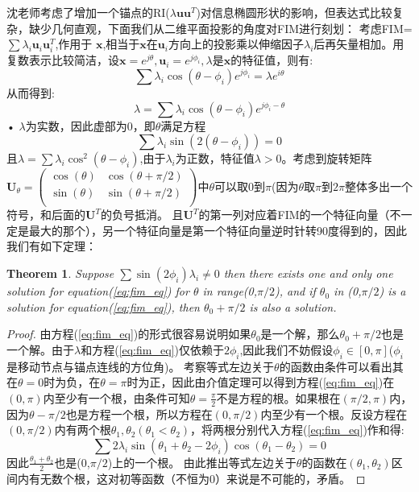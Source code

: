 \documentclass[12pt]{article}
\newtheorem{thm}{Theorem}[section]
\theoremstyle{remark}
\begin{document}
沈老师考虑了增加一个锚点的RI($\lambda \bm{u}\bm{u}^T$)对信息椭圆形状的影响，但表达式比较复杂，缺少几何直观，下面我们从二维平面投影的角度对FIM进行刻划：
考虑FIM=$\sum \lambda_i \bm{u}_i \bm{u}_i^T$,作用于
$\bm{x}$,相当于$\bm{x}$在$\bm{u}_i$方向上的投影乘以伸缩因子$\lambda_i$后再矢量相加。用复数表示比较简洁，设$\bm{x}=e^{j\theta},\bm{u}_i=e^{j\phi_i},\lambda$是$\bm{x}$的特征值，则有:
\begin{equation}
\sum \lambda_i \cos(\theta-\phi_i)e^{j\phi_i}=\lambda e^{i\theta}
\end{equation}
从而得到:
\begin{equation}
\lambda=\sum \lambda_i \cos(\theta-\phi_i)e^{j\phi_i-\theta}
\end{equation}•
$\lambda$为实数，因此虚部为0，即$\theta$满足方程
\begin{equation}\label{eq:fim_eq}
\sum \lambda_i \sin(2(\theta-\phi_i))=0
\end{equation}
且$\lambda=\sum \lambda_i \cos^2(\theta-\phi_i)$,由于$\lambda_i$为正数，特征值$\lambda>0$。考虑到旋转矩阵$\bm{U}_{\theta}=\left(\begin{array}{cc}
\cos(\theta) & \cos(\theta+\pi/2) \\
\sin(\theta) & \sin(\theta+\pi/2) \\
\end{array}\right)$中$\theta$可以取0到$\pi$(因为$\theta$取$\pi$到$2\pi$整体多出一个符号，和后面的$\bm{U}^T$的负号抵消。
且$\bm{U}^T$的第一列对应着FIM的一个特征向量（不一定是最大的那个），另一个特征向量是第一个特征向量逆时针转90度得到的，因此我们有如下定理：
\begin{thm} Suppose $\sum \sin(2\phi_i)\lambda_i \neq 0$
then
there exists one and only one solution for equation(\ref{eq:fim_eq}) for $\theta$ in range(0,$\pi/2$),
and if $\theta_0$ in (0,$\pi/2$) is a solution for equation(\ref{eq:fim_eq}), then $\theta_0+\pi/2$ is also a solution.\end{thm}
\begin{proof}
由方程(\ref{eq:fim_eq})的形式很容易说明如果$\theta_0$是一个解，那么$\theta_0+\pi/2$也是一个解。由于$\lambda$和方程(\ref{eq:fim_eq})仅依赖于$2\phi_i$,因此我们不妨假设$\phi_i \in [0,\pi]$($\phi_i$是移动节点与锚点连线的方位角)。
考察等式左边关于$\theta$的函数由条件可以看出其在$\theta=0$时为负，在$\theta=\pi$时为正，因此由介值定理可以得到方程(\ref{eq:fim_eq})在$(0,\pi)$内至少有一个根，由条件可知$\theta=\frac{\pi}{2}$不是方程的根。如果根在$(\pi/2,\pi)$内，因为$\theta-\pi/2$也是方程一个根，所以方程在$(0,\pi/2)$内至少有一个根。反设方程在$(0,\pi/2)$内有两个根$\theta_1,\theta_2(\theta_1<\theta_2)$，将两根分别代入方程(\ref{eq:fim_eq})作和得:
\begin{equation}
\sum 2\lambda_i \sin(\theta_1+\theta_2-2\phi_i)\cos(\theta_1-\theta_2)=0
\end{equation}
因此$\frac{\theta_1+\theta_2}{2}$也是(0,$\pi/2$)上的一个根。
由此推出等式左边关于$\theta$的函数在$(\theta_1,\theta_2)$区间内有无数个根，这对初等函数（不恒为0）来说是不可能的，矛盾。
\end{proof}
\end{document}
